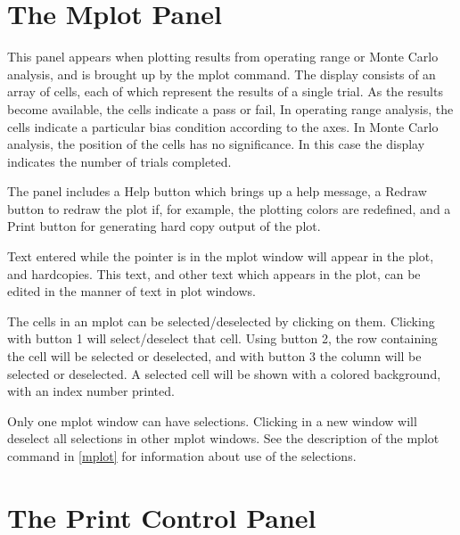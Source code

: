 \section{The Mplot Panel}


This panel appears when plotting results from operating range or Monte
Carlo analysis, and is brought up by the {\cb mplot} command.  The
display consists of an array of cells, each of which represent the
results of a single trial.  As the results become available, the cells
indicate a pass or fail, In operating range analysis, the cells
indicate a particular bias condition according to the axes.  In Monte
Carlo analysis, the position of the cells has no significance.  In
this case the display indicates the number of trials completed.

The panel includes a {\cb Help} button which brings up a help message,
a {\cb Redraw} button to redraw the plot if, for example, the plotting
colors are redefined, and a {\cb Print} button for generating hard
copy output of the plot.

Text entered while the pointer is in the {\cb mplot} window will
appear in the plot, and hardcopies.  This text, and other text which
appears in the plot, can be edited in the manner of text in {\cb plot}
windows.

The cells in an {\cb mplot} can be selected/deselected by clicking on
them.  Clicking with button 1 will select/deselect that cell.  Using
button 2, the row containing the cell will be selected or deselected,
and with button 3 the column will be selected or deselected.  A
selected cell will be shown with a colored background, with an index
number printed.

Only one {\cb mplot} window can have selections.  Clicking in a new
window will deselect all selections in other {\cb mplot} windows.  See
the description of the {\cb mplot} command in \ref{mplot} for
information about use of the selections.


\section{The Print Control Panel}


